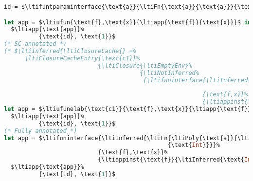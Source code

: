 {
\singlespacing
\begin{lstlisting}[language=ml,mathescape=true]
id = $\ltifuntparaminterface{\text{a}}{\ltiFn{\text{a}}{\text{a}}}{\text{x}}{\text{x}}$

let app = $\ltiufun{\text{f},\text{x}}{\ltiapp{\text{f}}{\text{x}}}$ in
  $\ltiapp{\text{app}}%
          {\text{id}, \text{1}}$
(* SC annotated *)
(* $\ltiInferred{\ltiClosureCache{} =%
      \ltiClosureCacheEntry{\text{c1}}%
                           {\ltiClosure{\ltiEmptyEnv}%
                                       {\ltiNotInferred%
                                        {\ltifuninterface{\ltiInferred{\ltiFn{\ltiPoly{\text{a}}{\ltiFn{\text{a}}{\text{a}}},\text{Int}}%
                                                                             {\text{Int}}}}%
                                                         {\text{f,x}}%
                                                         {\ltiappinst{\text{f}}{\ltiInferred{\text{Int}}}{\text{x}}}}}}}$ *)
let app = $\ltiufunelab{\text{c1}}{\text{f},\text{x}}{\ltiapp{\text{f}}{\text{x}}}$ in
  $\ltiapp{\text{app}}%
          {\text{id}, \text{1}}$
(* Fully annotated *)
let app = $\ltifuninterface{\ltiInferred{\ltiFn{\ltiPoly{\text{a}}{\ltiFn{\text{a}}{\text{a}}},\text{Int}}%
                                               {\text{Int}}}}%
                           {\text{f},\text{x}}%
                           {\ltiappinst{\text{f}}{\ltiInferred{\text{Int}}}{\text{x}}}$ in
  $\ltiapp{\text{app}}%
          {\text{id}, \text{1}}$
\end{lstlisting}
}


%
%

